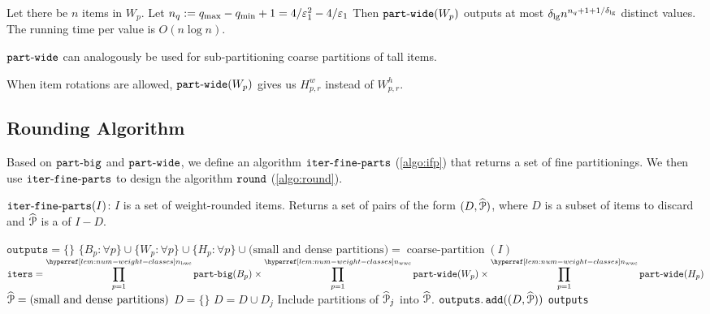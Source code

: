 \begin{claim}
\label{claim:part-wide-time}
Let there be $n$ items in $W_p$. Let
$n_q := q_{\max} - q_{\min} + 1 = 4/\varepsilon_1^2 - 4/\varepsilon_1$
Then $\operatorname{\mathtt{part-wide}}(W_p)$ outputs at most $\delta_{\mathrm{lg}} n^{n_q + 1 + 1/\delta_{\mathrm{lg}}}$
distinct values. The running time per value is $O(n\log n)$.
\end{claim}

$\operatorname{\mathtt{part-wide}}$ can analogously be used for sub-partitioning coarse partitions of tall items.

When item rotations are allowed, $\operatorname{\mathtt{part-wide}}(W_p)$ gives us $H^w_{p,r}$ instead of $W^h_{p,r}$.

\subsection{Rounding Algorithm}

Based on $\operatorname{\mathtt{part-big}}$ and $\operatorname{\mathtt{part-wide}}$, we define an algorithm $\operatorname{\mathtt{iter-fine-parts}}$ (\cref{algo:ifp})
that returns a set of fine partitionings.
We then use $\operatorname{\mathtt{iter-fine-parts}}$ to design the algorithm $\operatorname{\mathtt{round}}$ (\cref{algo:round}).

\begin{algorithm}[htb]
\caption{$\operatorname{\mathtt{iter-fine-parts}}(I)$: $I$ is a set of weight-rounded items.
Returns a set of pairs of the form $(D, \widehat{\mathcal{P}})$,
where $D$ is a subset of items to discard
and $\widehat{\mathcal{P}}$ is a \finePartHyp{} of $I-D$.}
\label{algo:ifp}
\begin{algorithmic}[1]
\State $\texttt{outputs} = \{\}$
\State $\{B_p: \forall p\} \cup \{W_p: \forall p\} \cup \{H_p: \forall p\}
    \cup \textrm{(small and dense partitions)}
    = \hyperref[obs:coarse-part]{\operatorname{coarse-partition}}(I)$
\State $\texttt{iters} = {\displaystyle \cartProd_{p=1}^{\nbwcHyp} \partBigHyp(B_p)
        \times \cartProd_{p=1}^{\nwwcHyp} \partWideHyp(W_p)
        \times \cartProd_{p=1}^{\nwwcHyp} \partWideHyp(H_p)}$
    \State $\widehat{\mathcal{P}} = \textrm{(small and dense partitions)}$
    \State $D = \{\}$
        \State $D = D \cup D_j$
        \State Include partitions of $\widehat{\mathcal{P}}_j$ into $\widehat{\mathcal{P}}$.
    \EndFor
    \State $\operatorname{\mathtt{outputs.add}}((D, \widehat{\mathcal{P}}))$
\EndFor
\State \Return \texttt{outputs}
\end{algorithmic}
\end{algorithm}


